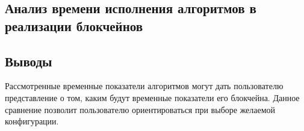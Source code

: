 \subsection{Анализ времени исполнения алгоритмов в реализации блокчейнов}

\newpage
\subsection{Выводы}
Рассмотренные временные показатели алгоритмов могут дать пользователю
представление о том, каким будут временные показатели его блокчейна. Данное
сравнение позволит пользователю ориентироваться при выборе желаемой
конфигурации.
